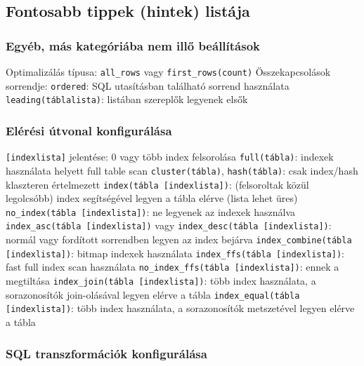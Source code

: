 \documentclass[12pt,a4paper]{article}
\begin{document}
\pagebreak

\subsection{Fontosabb tippek (hintek) listája}

\subsubsection{Egyéb, más kategóriába nem illő beállítások}

\begin{outline}
	\1 Optimalizálás típusa: \texttt{all\_rows} vagy \texttt{first\_rows(count)}
	\1 Összekapcsolások sorrendje:
		\2 \texttt{ordered}: SQL utasításban található sorrend használata
		\2 \texttt{leading(táblalista)}: listában szereplők legyenek elsők
\end{outline}

\subsubsection{Elérési útvonal konfigurálása}

\begin{outline}
	\1 \texttt{[indexlista]} jelentése: 0 vagy több index felsorolása
	\1 \texttt{full(tábla)}: indexek használata helyett full table scan
	\1 \texttt{cluster(tábla)}, \texttt{hash(tábla)}: csak index/hash klaszteren értelmezett
	\1 \texttt{index(tábla [indexlista])}: (felsoroltak közül legolcsóbb) index segítségével legyen a tábla elérve (lista lehet üres)
		\2 \texttt{no\_index(tábla [indexlista])}: ne legyenek az indexek használva
	\1 \texttt{index\_asc(tábla [indexlista])} vagy \texttt{index\_desc(tábla [indexlista])}: normál vagy fordított sorrendben legyen az index bejárva
	\1 \texttt{index\_combine(tábla [indexlista])}: bitmap indexek használata
	\1 \texttt{index\_ffs(tábla [indexlista])}: fast full index scan használata
		\2 \texttt{no\_index\_ffs(tábla [indexlista])}: ennek a megtiltása
	\1 \texttt{index\_join(tábla [indexlista])}: több index használata, a sorazonosítók join-olásával legyen elérve a tábla
	\1 \texttt{index\_equal(tábla [indexlista])}: több index használata, a sorazonosítók metszetével legyen elérve a tábla 
\end{outline}

\pagebreak

\subsubsection{SQL transzformációk konfigurálása}
\end{document}
